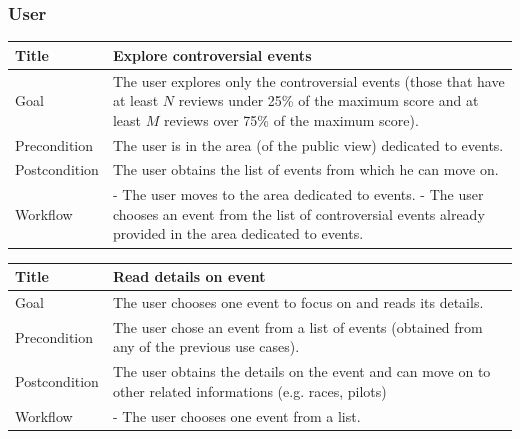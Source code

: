 \documentclass{beamer}
\begin{document}


\begin{frame}
    \frametitle{User}
    \begin{table}
        \tiny
        \begin{tabular}{|p{2cm}|p{6cm}|}
        \hline
        Title & \textbf{Explore controversial events} \\
        \hline
        Goal & The user explores only the controversial events (those that have at least $N$ reviews under 25\% of the maximum score
        and at least $M$ reviews over 75\% of the maximum score). \\
        \hline
        Precondition & The user is in the area (of the public view) dedicated to events.\\
        \hline
        Postcondition & The user obtains the list of events from which he can move on.\\
        \hline
        Workflow &
        - The user moves to the area dedicated to events. \newline
        - The user chooses an event from the list of controversial events already provided in the area dedicated to events. \\
        \hline
        \end{tabular}
\end{table}

\begin{table}
    \tiny
    \begin{tabular}{|p{2cm}|p{6cm}|}
    \hline
    Title & \textbf{Read details on event} \\
    \hline
    Goal & The user chooses one event to focus on and reads its details. \\
    \hline
    Precondition & The user chose an event from a list of events (obtained from any of the previous use cases).\\
    \hline
    Postcondition & The user obtains the details on the event and can move on to other related
    informations (e.g. races, pilots) \\
    \hline
    Workflow &
    - The user chooses one event from a list. \\
    \hline
    \end{tabular}
\end{table}
\end{frame}
\end{document}

